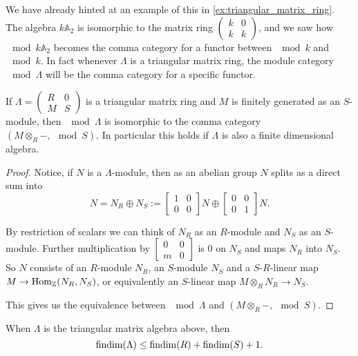 We have already hinted at an example of this in \cref{ex:triangular_matrix_ring}. The algebra $k\mathbb A_2$ is isomorphic to the matrix ring $\begin{pmatrix}
k & 0\\
k & k
\end{pmatrix}$, and we saw how $\mod k\mathbb A_2$ becomes the comma category for a functor between $\mod k$ and $\mod k$. In fact whenever $\Lambda$ is a triangular matrix ring, the module category $\mod \Lambda$ will be the comma category for a specific functor.

\begin{prop}\label{prop:triangular_matrix_is_comma_cat}
	If $\Lambda = \begin{pmatrix}
	R & 0\\
	M & S
	\end{pmatrix}$ is a triangular matrix ring and $M$ is finitely generated as an $S$-module, then $\mod \Lambda$ is isomorphic to the comma category $(M \otimes_R -, \mod S)$. In particular this holds if $\Lambda$ is also a finite dimensional algebra.
	\begin{proof}
		Notice, if $N$ is a $\Lambda$-module, then as an abelian group $N$ splits as a direct sum into
		$$N= N_R \oplus N_S :=
		\begin{bmatrix}
		1 & 0\\
		0 & 0
		\end{bmatrix}N \oplus
		\begin{bmatrix}
		0 & 0\\
		0 & 1
		\end{bmatrix}N.$$
		
		By restriction of scalars we can think of $N_R$ as an $R$-module and $N_S$ as an $S$-module. Further multiplication by $\begin{bmatrix}
		0 & 0\\
		m & 0
		\end{bmatrix}$ is 0 on $N_S$ and maps $N_R$ into $N_S$. So $N$ consists of an $R$-module $N_R$, an $S$-module $N_S$ and a $S$-$R$-linear map $M \to \operatorname{Hom}_\mathbb{Z}(N_R, N_S)$, or equivalently an $S$-linear map $M \otimes_R N_R \to N_S$.
		
		This gives us the equivalence between $\mod \Lambda$ and $(M \otimes_R -, \mod S)$.
	\end{proof}
\end{prop} 

\begin{cor}
	When $\Lambda$ is the triangular matrix algebra above, then 
	$$\operatorname{findim}(\Lambda) \leq \operatorname{findim}(R) + \operatorname{findim}(S)+1.$$
\end{cor}


